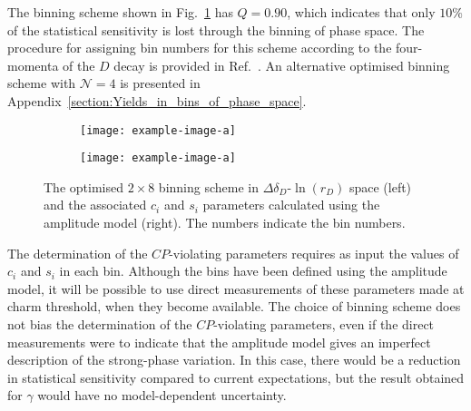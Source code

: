 \documentclass[12pt, a4paper, notitlepage, onecolumn]{article}
\begin{document}
The binning scheme shown in Fig.~\ref{figure:Binning_scheme_plot_8bins} has $Q = 0.90$, which indicates that only $10\%$ of the statistical sensitivity is lost through the binning of phase space. The procedure for assigning bin numbers for this scheme according to the four-momenta of the $D$ decay is provided in Ref.~\cite{cite:KKpipiBinningScheme}. An alternative optimised binning scheme with $\mathcal{N}=4$ is presented in Appendix~\ref{section:Yields_in_bins_of_phase_space}.

\begin{figure}[tb]
    \centering
    \begin{subfigure}{0.57\textwidth}
        \texttt{[image: example-image-a]}  
        \caption{}
        \label{figure:Binning_scheme_plot_8bins}
    \end{subfigure}%
    \hfill
    \begin{subfigure}{0.43\textwidth}
        \texttt{[image: example-image-a]}  
        \caption{}
        \label{figure:ci_si_2x8}
    \end{subfigure}
    \caption{The optimised $2\times 8$ binning scheme in $\Delta \delta_D$-$\ln(r_D)$ space (left) and the associated $c_i$ and $s_i$ parameters calculated using the amplitude  model (right). The numbers indicate the bin numbers.}
    \label{figure:Binning_scheme_plots_8bins}
\end{figure}

The determination of the $C\!P$-violating parameters requires as input the values of $c_i$ and $s_i$ in each bin. Although the bins have been defined using the amplitude model, it will be possible to use direct measurements of these parameters made at charm threshold, when they become available. The choice of binning scheme does not bias the determination of the $C\!P$-violating parameters, even if the direct measurements were to indicate that the amplitude model gives an imperfect description of the strong-phase variation.  In this case, there would be a reduction in statistical sensitivity compared to current expectations, but the result obtained for $\gamma$ would have no model-dependent uncertainty.  
\end{document}
